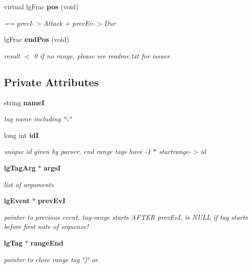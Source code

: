 \begin{CompactItemize}
virtual lg\-Frac {\bf pos} (void)
\begin{CompactList}\small\item\em == prev\-I-$>$Attack + prev\-Ev-$>$Dur \item\end{CompactList}\item 
lg\-Frac {\bf end\-Pos} (void)
\begin{CompactList}\small\item\em result $<$ 0 if no range, please see readme.txt for issues \item\end{CompactList}\end{CompactItemize}
\subsection*{Private Attributes}
\begin{CompactItemize}
\item 
string {\bf name\-I}
\begin{CompactList}\small\item\em tag name including \char`\"{}$\backslash$\char`\"{} \item\end{CompactList}\item 
long int {\bf id\-I}
\begin{CompactList}\small\item\em unique id given by parser, end range tags have -1 $\ast$ startrange-$>$id \item\end{CompactList}\item 
{\bf lg\-Tag\-Arg} $\ast$ {\bf args\-I}
\begin{CompactList}\small\item\em list of arguments \item\end{CompactList}\item 
{\bf lg\-Event} $\ast$ {\bf prev\-Ev\-I}
\begin{CompactList}\small\item\em pointer to previous event, tag-range starts AFTER prev\-Ev\-I, is NULL if tag starts before first note of sequence! \item\end{CompactList}\item 
{\bf lg\-Tag} $\ast$ {\bf range\-End}
\begin{CompactList}\small\item\em pointer to close range tag \char`\"{})\char`\"{} or  \item\end{CompactList}\end{CompactItemize}
